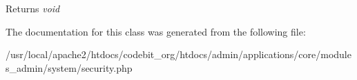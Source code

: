 \begin{DoxyReturn}{Returns}
{\itshape void} 
\end{DoxyReturn}


The documentation for this class was generated from the following file\-:\begin{DoxyCompactItemize}
\item 
/usr/local/apache2/htdocs/codebit\-\_\-org/htdocs/admin/applications/core/modules\-\_\-admin/system/security.\-php\end{DoxyCompactItemize}
